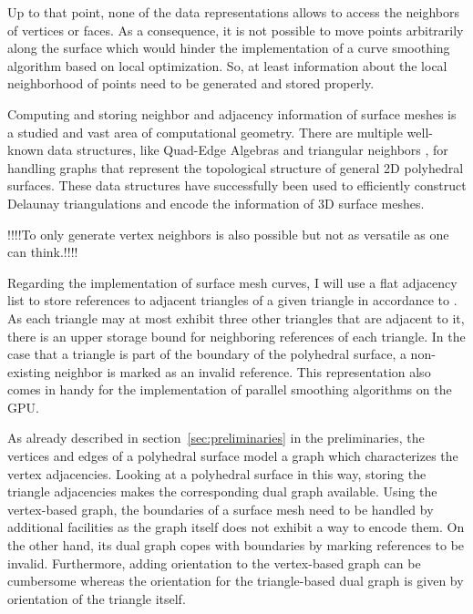 \documentclass{stdlocal}
\begin{document}
  Up to that point, none of the data representations allows to access the neighbors of vertices or faces.
  As a consequence, it is not possible to move points arbitrarily along the surface which would hinder the implementation of a curve smoothing algorithm based on local optimization.
  So, at least information about the local neighborhood of points need to be generated and stored properly.

  Computing and storing neighbor and adjacency information of surface meshes is a studied and vast area of computational geometry.
  There are multiple well-known data structures, like Quad-Edge Algebras \autocite{guibas1985} and triangular neighbors \autocite{shewchuk1996}, for handling graphs that represent the topological structure of general 2D polyhedral surfaces.
  These data structures have successfully been used to efficiently construct Delaunay triangulations and encode the information of 3D surface meshes.

  !!!!To only generate vertex neighbors is also possible but not as versatile as one can think.!!!!

  Regarding the implementation of surface mesh curves, I will use a flat adjacency list to store references to adjacent triangles of a given triangle in accordance to \textcite{mancinelli2022}.
  As each triangle may at most exhibit three other triangles that are adjacent to it, there is an upper storage bound for neighboring references of each triangle.
  In the case that a triangle is part of the boundary of the polyhedral surface, a non-existing neighbor is marked as an invalid reference.
  This representation also comes in handy for the implementation of parallel smoothing algorithms on the GPU.

  As already described in section~\ref{sec:preliminaries} in the preliminaries, the vertices and edges of a polyhedral surface model a graph which characterizes the vertex adjacencies.
  Looking at a polyhedral surface in this way, storing the triangle adjacencies makes the corresponding dual graph available.
  Using the vertex-based graph, the boundaries of a surface mesh need to be handled by additional facilities as the graph itself does not exhibit a way to encode them.
  On the other hand, its dual graph copes with boundaries by marking references to be invalid.
  Furthermore, adding orientation to the vertex-based graph can be cumbersome whereas the orientation for the triangle-based dual graph is given by orientation of the triangle itself.

\end{document}
